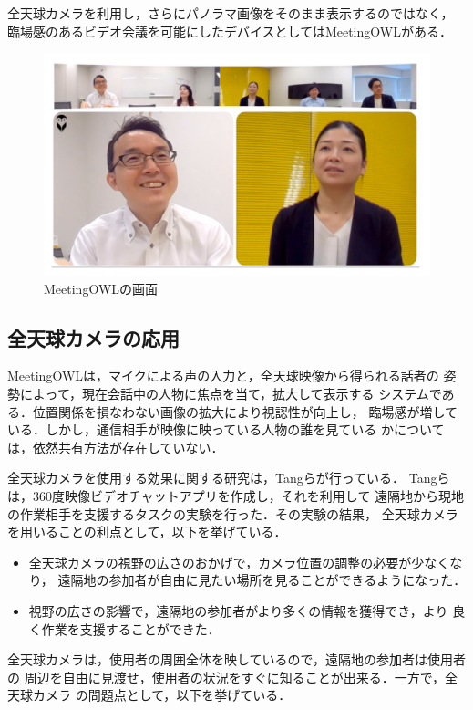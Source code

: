 全天球カメラを利用し，さらにパノラマ画像をそのまま表示するのではなく，
臨場感のあるビデオ会議を可能にしたデバイスとしてはMeetingOWL\cite{21}がある．

\begin{figure}[tbp]
  \centering
  \includegraphics[scale=0.7]{fig/OWL.png}
  \caption{MeetingOWLの画面\cite{21}}
\end{figure}

\subsection*{全天球カメラの応用}

MeetingOWLは，マイクによる声の入力と，全天球映像から得られる話者の
姿勢によって，現在会話中の人物に焦点を当て，拡大して表示する
システムである．位置関係を損なわない画像の拡大により視認性が向上し，
臨場感が増している．しかし，通信相手が映像に映っている人物の誰を見ている
かについては，依然共有方法が存在していない．

全天球カメラを使用する効果に関する研究は，Tangら\cite{19}が行っている．
Tangらは，360度映像ビデオチャットアプリを作成し，それを利用して
遠隔地から現地の作業相手を支援するタスクの実験を行った．その実験の結果，
全天球カメラを用いることの利点として，以下を挙げている．

\begin{itemize}
  \item 全天球カメラの視野の広さのおかげで，カメラ位置の調整の必要が少なくなり，
  遠隔地の参加者が自由に見たい場所を見ることができるようになった．
  \item 視野の広さの影響で，遠隔地の参加者がより多くの情報を獲得でき，より
  良く作業を支援することができた．
\end{itemize}

全天球カメラは，使用者の周囲全体を映しているので，遠隔地の参加者は使用者の
周辺を自由に見渡せ，使用者の状況をすぐに知ることが出来る．一方で，全天球カメラ
の問題点として，以下を挙げている．

